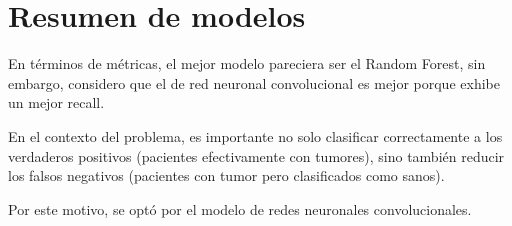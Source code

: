 \section{Resumen de modelos}

En términos de métricas, el mejor modelo pareciera ser el Random Forest, sin embargo, considero que el de red neuronal convolucional es mejor porque exhibe un mejor recall. 

En el contexto del problema, es importante no solo clasificar correctamente a los verdaderos positivos (pacientes efectivamente con tumores), sino también reducir los falsos negativos (pacientes con tumor pero clasificados como sanos).

Por este motivo, se optó por el modelo de redes neuronales convolucionales.









